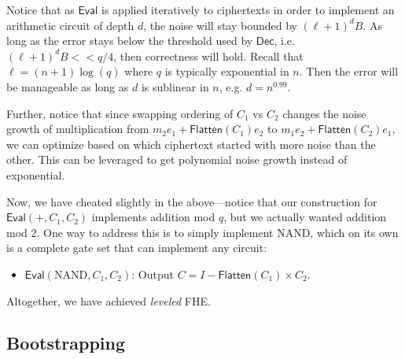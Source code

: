 
Notice that as $\mathsf{Eval}$ is applied iteratively to ciphertexts in order to implement an arithmetic circuit of depth $d$, the noise will stay bounded by $(\ell+1)^d B$. 
As long as the error stays below the threshold used by $\mathsf{Dec}$, i.e. $(\ell+1)^d B << q/4$, then correctness will hold. 
Recall that $\ell = (n+1) \log(q)$ where $q$ is typically exponential in $n$. 
Then the error will be manageable as long as $d$ is sublinear in $n$, e.g. $d = n^{0.99}$. 

Further, notice that since swapping ordering of $C_1$ vs $C_2$ changes the noise growth of multiplication from $m_2 e_1 + \mathsf{Flatten}(C_1) e_2$ to $m_1 e_2 + \mathsf{Flatten}(C_2) e_1$, we can optimize based on which ciphertext started with more noise than the other. 
This can be leveraged to get polynomial noise growth instead of exponential. 


Now, we have cheated slightly in the above---notice that our construction for $\mathsf{Eval}(+, C_1, C_2)$ implements addition mod $q$, but we actually wanted addition mod 2. 
One way to address this is to simply implement NAND, which on its own is a complete gate set that can implement any circuit: 
\begin{itemize}
    \item $\mathsf{Eval}(\text{NAND}, C_1, C_2)$: Output $C = I - \mathsf{Flatten}(C_1) \times C_2$. 
\end{itemize}

Altogether, we have achieved \emph{leveled} FHE. 


\subsection{Bootstrapping} 

